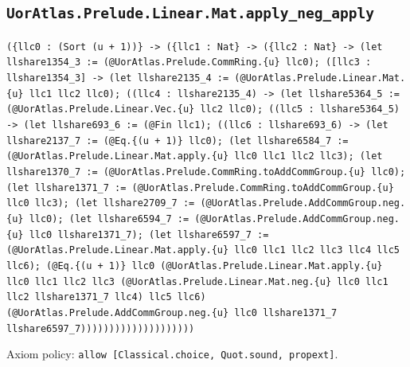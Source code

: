 \documentclass[11pt]{article}
\begin{document}
\subsection*{\texttt{UorAtlas.Prelude.Linear.Mat.apply\_neg\_apply}}
\noindent\texttt{(\{llc0 : (Sort (u + 1))\} -> (\{llc1 : Nat\} -> (\{llc2 : Nat\} -> (let llshare1354\_3 := (@UorAtlas.Prelude.CommRing.\{u\} llc0); ([llc3 : llshare1354\_3] -> (let llshare2135\_4 := (@UorAtlas.Prelude.Linear.Mat.\{u\} llc1 llc2 llc0); ((llc4 : llshare2135\_4) -> (let llshare5364\_5 := (@UorAtlas.Prelude.Linear.Vec.\{u\} llc2 llc0); ((llc5 : llshare5364\_5) -> (let llshare693\_6 := (@Fin llc1); ((llc6 : llshare693\_6) -> (let llshare2137\_7 := (@Eq.\{(u + 1)\} llc0); (let llshare6584\_7 := (@UorAtlas.Prelude.Linear.Mat.apply.\{u\} llc0 llc1 llc2 llc3); (let llshare1370\_7 := (@UorAtlas.Prelude.CommRing.toAddCommGroup.\{u\} llc0); (let llshare1371\_7 := (@UorAtlas.Prelude.CommRing.toAddCommGroup.\{u\} llc0 llc3); (let llshare2709\_7 := (@UorAtlas.Prelude.AddCommGroup.neg.\{u\} llc0); (let llshare6594\_7 := (@UorAtlas.Prelude.AddCommGroup.neg.\{u\} llc0 llshare1371\_7); (let llshare6597\_7 := (@UorAtlas.Prelude.Linear.Mat.apply.\{u\} llc0 llc1 llc2 llc3 llc4 llc5 llc6); (@Eq.\{(u + 1)\} llc0 (@UorAtlas.Prelude.Linear.Mat.apply.\{u\} llc0 llc1 llc2 llc3 (@UorAtlas.Prelude.Linear.Mat.neg.\{u\} llc0 llc1 llc2 llshare1371\_7 llc4) llc5 llc6) (@UorAtlas.Prelude.AddCommGroup.neg.\{u\} llc0 llshare1371\_7 llshare6597\_7))))))))))))))))))))}\par
\noindent Axiom policy: \texttt{allow [Classical.choice, Quot.sound, propext]}.\par
\end{document}
